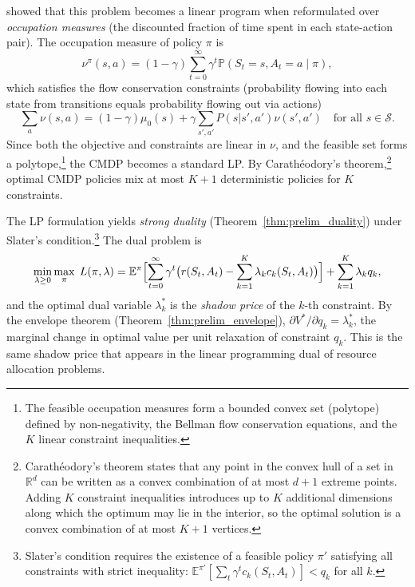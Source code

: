 \citet{Altman1999} showed that this problem becomes a linear
program when reformulated over \emph{occupation measures} (the discounted fraction of
time spent in each state-action pair). The occupation measure of policy
$\pi$ is
\begin{equation}
  \nu^\pi(s,a) = (1-\gamma) \sum_{t=0}^\infty \gamma^t
  \mathbb{P}(S_t = s, A_t = a \mid \pi),
  \label{eq:occupation_measure}
\end{equation}
which satisfies the flow conservation constraints (probability flowing
into each state from transitions equals probability flowing out via
actions)
\begin{equation}
  \sum_a \nu(s,a) = (1-\gamma)\mu_0(s) + \gamma \sum_{s',a'} P(s|s',a')
  \nu(s',a') \quad \text{for all } s \in \mathcal{S}.
  \label{eq:bellman_flow}
\end{equation}
Since both the objective and
constraints are linear in $\nu$, and the feasible set forms a
polytope,\footnote{The feasible occupation measures form a bounded convex
set (polytope) defined by non-negativity, the Bellman flow conservation
equations, and the $K$ linear constraint inequalities.} the CMDP becomes a
standard LP. By Carath\'eodory's theorem,\footnote{Carath\'eodory's theorem
states that any point in the convex hull of a set in $\mathbb{R}^d$ can be
written as a convex combination of at most $d+1$ extreme points. Adding $K$
constraint inequalities introduces up to $K$ additional dimensions along
which the optimum may lie in the interior, so the optimal solution is a
convex combination of at most $K+1$ vertices.}
optimal CMDP policies mix at most $K+1$ deterministic policies for $K$
constraints.

The LP formulation yields \emph{strong duality} (Theorem~\ref{thm:prelim_duality}) under Slater's
condition.\footnote{Slater's condition requires the existence of a feasible
policy $\pi'$ satisfying all constraints with strict inequality:
$\mathbb{E}^{\pi'}[\sum_t \gamma^t c_k(S_t,A_t)] < q_k$ for all $k$.}
The dual problem is
\begin{equation}
  \min_{\lambda \geq 0} \max_\pi \; L(\pi, \lambda)
  = \mathbb{E}^\pi\Bigl[\sum_{t=0}^\infty \gamma^t \bigl(
    r(S_t,A_t) - \sum_{k=1}^K \lambda_k c_k(S_t,A_t)
  \bigr)\Bigr] + \sum_{k=1}^K \lambda_k q_k,
  \label{eq:cmdp_lagrangian}
\end{equation}
and the optimal dual variable $\lambda_k^*$ is the \emph{shadow price} of
the $k$-th constraint. By the envelope theorem (Theorem~\ref{thm:prelim_envelope}),
$\partial V^* / \partial q_k = \lambda_k^*$, the marginal change in optimal
value per unit relaxation of constraint $q_k$. This is the same shadow price
that appears in the linear programming dual of resource allocation
problems.

